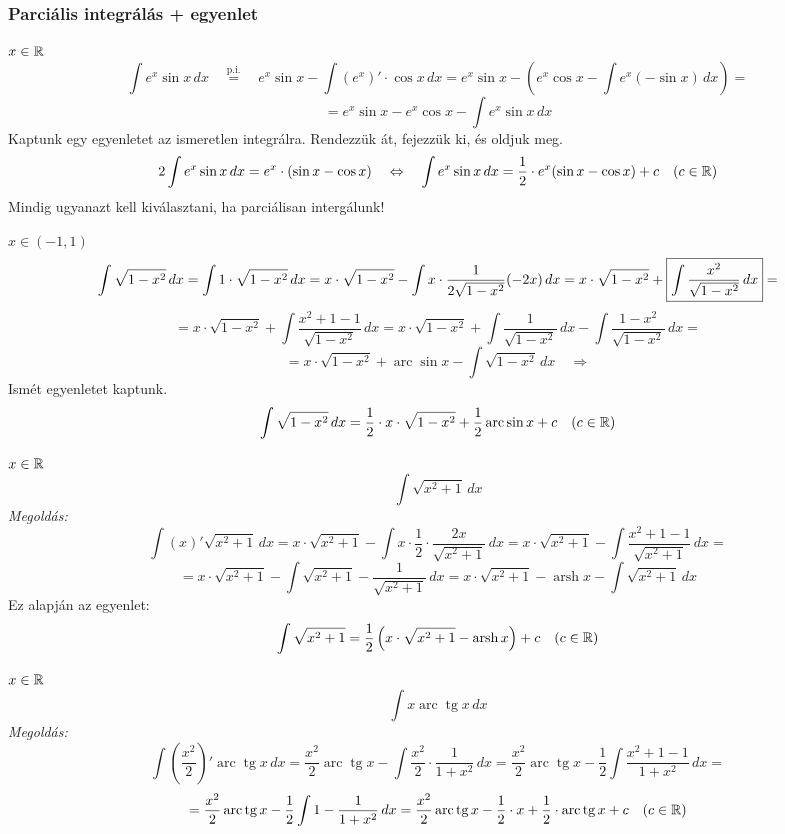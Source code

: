\documentclass[a4paper,11.5pt]{article}
\DeclareMathOperator{\tg}{tg}
\DeclareMathOperator{\arsh}{arsh}
\DeclareMathOperator{\arc}{arc}
\begin{document}
	\subsubsection{Parciális integrálás + egyenlet}
	\begin{task}$x\in\mathbb{R}$
		\[ \int e^x\sin x\,dx\quad \overset{\text{p.i.}}{=}\quad e^x\sin x-\int (e^x)'\cdot\cos x\,dx=e^x\sin x-\left(e^x\cos x-\int e^x(-\sin x)\,dx\right)=\]
		\[=e^x\sin x-e^x\cos x-\int e^x\sin x\,dx \]
		Kaptunk egy egyenletet az ismeretlen integrálra. Rendezzük át, fejezzük ki, és oldjuk meg.
		\[ 2\int e^x\sin x\,dx=e^x\cdot(\sin x-\cos x)\quad \Leftrightarrow\quad \int e^x\sin x\,dx=\frac{1}{2}\cdot e^x(\sin x-\cos x)+c\quad (c\in\mathbb{R}) \]
		Mindig ugyanazt kell kiválasztani, ha parciálisan intergálunk!
	\end{task}
	\begin{task}$x\in(-1,1)$
		\[ \int\sqrt{1-x^2}\,dx=\int1\cdot\sqrt{1-x^2}\,dx=x\cdot\sqrt{1-x^2}-\int x\cdot\frac{1}{2\sqrt{1-x^2}}(-2x)\,dx=x\cdot\sqrt{1-x^2}+\text{\fbox{$\displaystyle \int\frac{x^2}{\sqrt{1-x^2}}\,dx$}}= \]
		\[=x\cdot\sqrt{1-x^2}+\int\frac{x^2+1-1}{\sqrt{1-x^2}}\,dx=x\cdot\sqrt{1-x^2}+\int\frac{1}{\sqrt{1-x^2}}\,dx-\int\frac{1-x^2}{\sqrt{1-x^2}}\,dx=\]
		\[=x\cdot\sqrt{1-x^2}+\arc\sin x-\int\sqrt{1-x^2}\,dx\quad \Rightarrow \]
		Ismét egyenletet kaptunk.
		\[ \int\sqrt{1-x^2}\,dx=\frac{1}{2} \cdot x\cdot\sqrt{1-x^2}+\frac{1}{2}\arc\sin x+c\quad (c\in\R) \]
	\end{task}
	\begin{exercise}$x\in\mathbb{R}$
		\[ \int\sqrt{x^2+1}\,dx \]
		\textit{Megoldás:}
		\[ \int(x)'\sqrt{x^2+1}\,dx=x\cdot\sqrt{x^2+1}-\int x\cdot\frac{1}{2}\cdot\frac{2x}{\sqrt{x^2+1}}\,dx=x\cdot\sqrt{x^2+1}-\int\frac{x^2+1-1}{\sqrt{x^2+1}}\,dx=\]
		\[=x\cdot\sqrt{x^2+1}-\int\sqrt{x^2+1}-\frac{1}{\sqrt{x^2+1}}\,dx=x\cdot\sqrt{x^2+1}-\arsh x - \int\sqrt{x^2+1}\,dx \]
		Ez alapján az egyenlet:
		\[ \int\sqrt{x^2+1}=\frac{1}{2}\left(x\cdot\sqrt{x^2+1}-\arsh x \right)+c\quad (c\in\R) \]
	\end{exercise}
	\begin{exercise}$x\in\mathbb{R}$
		\[ \int x\arc\tg x\,dx \]
		\textit{Megoldás:}
		\[ \int \left(\frac{x^2}{2}\right)'\arc\tg x\,dx=\frac{x^2}{2}\arc\tg x-\int\frac{x^2}{2}\cdot\frac{1}{1+x^2}\,dx=\frac{x^2}{2}\arc\tg x-\frac{1}{2}\int\frac{x^2+1-1}{1+x^2}\,dx= \]
		\[ =\frac{x^2}{2}\arc\tg x-\frac{1}{2}\int 1-\frac{1}{1+x^2}\,dx=\frac{x^2}{2}\arc\tg x-\frac{1}{2}\cdot x+\frac{1}{2}\cdot\arc\tg x+c\quad (c\in\R) \]
	\end{exercise}
\end{document}

